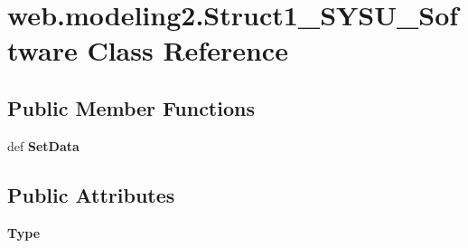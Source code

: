 \hypertarget{classweb_1_1modeling2_1_1_struct1___s_y_s_u___software}{\section{web.\-modeling2.\-Struct1\-\_\-\-S\-Y\-S\-U\-\_\-\-Software Class Reference}
\label{classweb_1_1modeling2_1_1_struct1___s_y_s_u___software}
}
\subsection*{Public Member Functions}
\begin{DoxyCompactItemize}
\item 
\hypertarget{classweb_1_1modeling2_1_1_struct1___s_y_s_u___software_ad73c4d66769931536fac69216ec80cb7}{def {\bfseries Set\-Data}}\label{classweb_1_1modeling2_1_1_struct1___s_y_s_u___software_ad73c4d66769931536fac69216ec80cb7}

\end{DoxyCompactItemize}
\subsection*{Public Attributes}
\begin{DoxyCompactItemize}
\item 
\hypertarget{classweb_1_1modeling2_1_1_struct1___s_y_s_u___software_a46261ffd06b8aad29514e2080dd98af3}{{\bfseries Type}}\label{classweb_1_1modeling2_1_1_struct1___s_y_s_u___software_a46261ffd06b8aad29514e2080dd98af3}

\end{DoxyCompactItemize}
